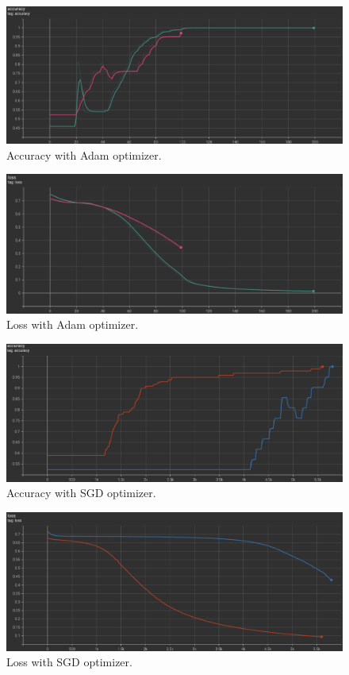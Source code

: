 	\begin{figure}[H]
		\centering
		\includegraphics[scale=0.5]{img/adam_acc.png}
		\caption{Accuracy with Adam optimizer.}
		\label{optim-acc-adam}
	\end{figure}
	\begin{figure}[H]
		\centering
		\includegraphics[scale=0.5]{img/adam_loss.png}
		\caption{Loss with Adam optimizer.}
		\label{optim-loss-adam}
	\end{figure}

	\begin{figure}[H]
		\centering
		\includegraphics[scale=0.5]{img/vanilla_acc.png}
		\caption{Accuracy with SGD optimizer.}
		\label{optim-acc-vanilla}
	\end{figure}
	\begin{figure}[H]
		\centering
		\includegraphics[scale=0.5]{img/vanilla_loss.png}
		\caption{Loss with SGD optimizer.}
		\label{optim-loss-vanilla}
	\end{figure}

